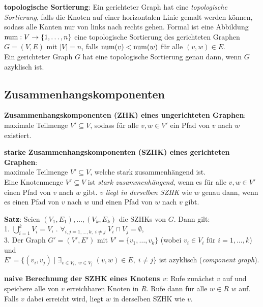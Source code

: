 \textbf{topologische Sortierung}:
Ein gerichteter Graph hat eine \emph{topologische Sortierung}, falls die
Knoten auf einer horizontalen Linie gemalt werden können, sodass
alle Kanten nur von links nach rechts gehen.
Formal ist eine Abbildung $\operatorname{num}: V \rightarrow \{1, \dotsc, n\}$ eine
topologische Sortierung des gerichteten Graphen $G = (V, E)$ mit $|V| = n$,
falls $\operatorname{num}(v) < \operatorname{num}(w)$ für alle $(v, w) \in E$. \\
Ein gerichteter Graph $G$ hat eine topologische Sortierung genau dann,
wenn $G$ azyklisch ist.

\subsection{%
    Zusammenhangskomponenten%
}

\textbf{Zusammenhangskomponenten (ZHK) eines ungerichteten Graphen}: \\
maximale Teilmenge $V' \subseteq V$, sodass für alle $v, w \in V'$ ein
Pfad von $v$ nach $w$ existiert.

\linie

\textbf{starke Zusammenhangskomponenten (SZHK) eines gerichteten Graphen}: \\
maximale Teilmenge $V' \subseteq V$, welche stark zusammenhängend ist. \\
Eine Knotenmenge $V' \subseteq V$ ist \emph{stark zusammenhängend}, wenn es
für alle $v, w \in V'$ einen Pfad von $v$ nach $w$ gibt.
$v$ \emph{liegt in derselben SZHK} wie $w$ genau dann, wenn es einen Pfad
von $v$ nach $w$ und einen Pfad von $w$ nach $v$ gibt.

\textbf{Satz}:
Seien $(V_1, E_1), \dotsc, (V_k, E_k)$ die SZHKs von $G$.
Dann gilt: \\
1. $\bigcup_{i=1}^k V_i = V$, \qquad{}. $\forall_{i, j = 1, \dotsc, k,\; i \not= j}\;
V_i \cap V_j = \emptyset$, \\
3. Der Graph $G' = (V', E')$ mit $V' = \{v_1, \dotsc, v_k\}$
(wobei $v_i \in V_i$ für $i = 1, \dotsc, k$) und \\
$E' = \{(v_i, v_j) \;|\;
\exists_{v \in V_i,\; w \in V_j}\; (v, w) \in E,\; i \not= j\}$ ist
azyklisch (\emph{component graph}).

\linie

\textbf{naive Berechnung der SZHK eines Knotens $v$}:
Rufe zunächst $v$\code{)} auf und speichere alle von $v$
erreichbaren Knoten in $R$.
Rufe dann für alle $w \in R$ $w$\code{)} auf.
Falls $v$ dabei erreicht wird, liegt $w$ in derselben SZHK wie $v$.

